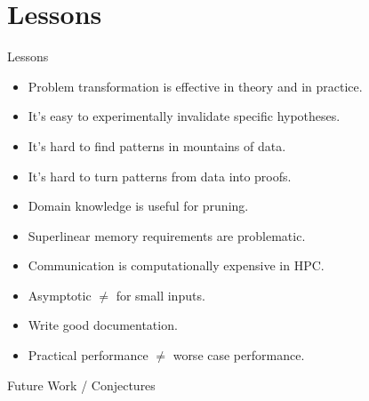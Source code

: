 \documentclass[t,10pt,
mathserif,xcolor=dvipsnames]{beamer}
\begin{document}
\section{Lessons}


\begin{myframe}{Lessons}

  \begin{itemize}
  \item Problem transformation is effective in theory and in practice.
  \item It's easy to experimentally invalidate specific hypotheses.
  \item It's hard to find patterns in mountains of data.  
  \item It's hard to turn patterns from data into proofs.
  \item Domain knowledge is useful for pruning.
  \item Superlinear memory requirements are problematic.
  \item Communication is computationally expensive in HPC.
  \item Asymptotic $\neq$ for small inputs.
  \item Write good documentation.
  \item Practical performance $\neq$ worse case performance.
  \end{itemize}
  
\end{myframe}

\begin{myframe}{Future Work / Conjectures}


  
\end{myframe}

\end{document}
